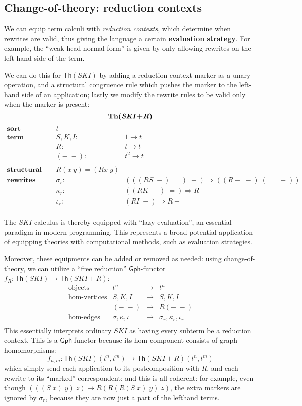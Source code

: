 \documentclass{amsart}
\theoremstyle{definition}
\newcommand{\Th}{\mathsf{Th}}
\newcommand{\Gph}{\mathsf{Gph}}
\newcommand{\maps}{\colon}
\begin{document}
\subsection{Change-of-theory: reduction contexts}
We can equip term calculi with \textit{reduction contexts}, which determine when rewrites are valid, thus giving the language a certain \textbf{evaluation strategy}. For example, the ``weak head normal form'' is given by only allowing rewrites on the left-hand side of the term.

We can do this for $\Th(SKI)$ by adding a reduction context marker as a unary operation, and a structural congruence rule which pushes the marker to the left-hand side of an application; lastly we modify the rewrite rules to be valid only when the marker is present:
$$\textbf{Th(\textit{SKI}+\textit{R})}$$
\[\begin{array}{rcl}
\textbf{sort} & t &\\
\textbf{term constructors} & S,K,I \maps &1 \to t\\
& R\maps & t \to t\\
& (-\; -)\maps & t^2 \to t\\\\
\textbf{structural congruence} & R(x\; y) = (Rx\; y) &\\
\textbf{rewrites} & \sigma_r\maps & (((RS\; -)\; =)\; \equiv) \Rightarrow ((R-\; \equiv)\; (=\; \equiv))\\
& \kappa_r\maps & ((RK\; -)\; =) \Rightarrow R-\\
& \iota_r\maps & (RI\; -) \Rightarrow R-\\
\end{array}\]

The $SKI$-calculus is thereby equipped with ``lazy evaluation'', an essential paradigm in modern programming. This represents a broad potential application of equipping theories with computational methods, such as evaluation strategies.

Moreover, these equipments can be added or removed as needed: using change-of-theory, we can utilize a ``free reduction'' $\Gph$-functor $f_R\maps\Th(SKI)\to \Th(SKI+R)$:
\[\begin{array}{rrcl}
\text{objects} & t^n & \mapsto & t^n\\
\text{hom-vertices} & S,K,I & \mapsto & S,K,I\\
& (-\; -) & \mapsto & R(-\; -)\\
\text{hom-edges} & \sigma, \kappa, \iota & \mapsto & \sigma_r, \kappa_r, \iota_r\\
\end{array}\]
This essentially interprets ordinary $SKI$ as having every subterm be a reduction context. This is a $\Gph$-functor because its hom component consists of graph-homomorphisms: $$f_{n,m}\maps \Th(SKI)(t^n,t^m) \to \Th(SKI+R)(t^n,t^m)$$ which simply send each application to its postcomposition with $R$, and each rewrite to its ``marked'' correspondent; and this is all coherent: for example, even though $(((S\; x)\; y)\; z) \mapsto R(R(R(S\; x)\; y)\; z)$, the extra markers are ignored by $\sigma_r$, because they are now just a part of the lefthand terms.
\end{document}
